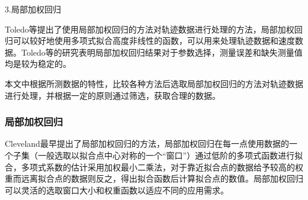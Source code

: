 
3.局部加权回归

Toledo等\cite{Toledo2007a}提出了使用局部加权回归的方法对轨迹数据进行处理的方法，局部加权回归可以较好地使用多项式拟合高度非线性的函数，可以用来处理轨迹数据和速度数据。Toledo等\cite{Toledo2007a}的研究表明局部加权回归结果对于参数选择，测量误差和缺失测量值均是较为稳定的。

本文中根据所测数据的特性，比较各种方法后选取局部加权回归的方法对轨迹数据进行处理，并根据一定的原则通过筛选，获取合理的数据。


\subsubsection{局部加权回归}
Cleveland\cite{Cleveland1979}最早提出了局部加权回归的方法，局部加权回归在每一点使用数据的一个子集（一般选取以拟合点中心对称的一个“窗口”）通过低阶的多项式函数进行拟合，多项式系数的估计采用加权最小二乘法，对于靠近拟合点的数据给予较高的权重而远离拟合点的数据则反之，得出拟合函数后计算拟合点的数值。局部加权回归可以灵活的选取窗口大小和权重函数以适应不同的应用需求。


